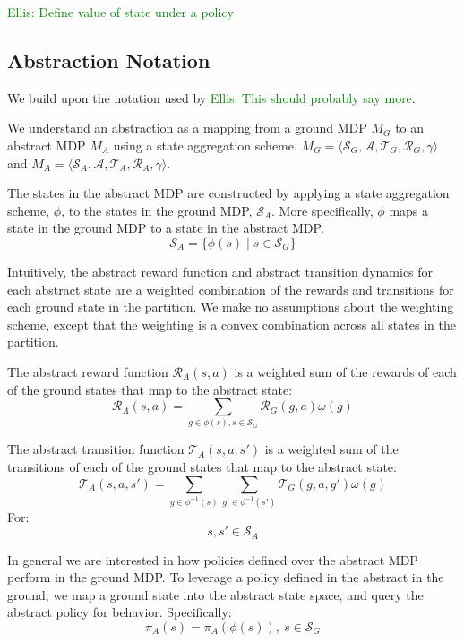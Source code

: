 \documentclass{article}
\newcommand\enote[1]{\textcolor{green}{Ellis: #1}}
\begin{document}
\enote{Define value of state under a policy}

\subsection{Abstraction Notation}
We build upon the notation used by \cite{li2006towards} \enote{This should probably say more}.

We understand an abstraction as a mapping from a ground MDP $M_G$ to an abstract MDP $M_A$ using a state aggregation scheme. $M_G = \langle \mathcal{S}_G, \mathcal{A}, \mathcal{T}_G, \mathcal{R}_G, \gamma \rangle$ and $M_A = \langle \mathcal{S}_A, \mathcal{A}, \mathcal{T}_A, \mathcal{R}_A, \gamma \rangle$.

The states in the abstract MDP are constructed by applying a state aggregation scheme, $\phi$, to the states in the ground MDP, $\mathcal{S}_A$. More specifically, $\phi$ maps a state in the ground MDP to a state in the abstract MDP.
\begin{equation}
\mathcal{S}_A = \{ \phi(s) \mid s \in \mathcal{S}_G\}
\end{equation}

Intuitively, the abstract reward function and abstract transition dynamics for each abstract state are a weighted combination of the rewards and transitions for each ground state in the partition. We make no assumptions about the weighting scheme, except that the weighting is a convex combination across all states in the partition.

The abstract reward function $\mathcal{R}_A(s,a)$ is a weighted sum of the rewards of each of the ground states that map to the abstract state:
\begin{equation}
\mathcal{R}_A(s,a) = \sum_{g \in \phi(s), s \in \mathcal{S}_G} \mathcal{R}_G(g,a) \omega(g) 
\end{equation}


The abstract transition function $\mathcal{T}_A(s,a,s')$ is a weighted sum of the transitions of each of the ground states that map to the abstract state:
\begin{equation}
\mathcal{T}_A(s,a,s') = \sum_{g \in \phi^{-1}(s)} \sum_{g' \in \phi^{-1}(s')} \mathcal{T}_G(g,a,g') \omega(g) 
\end{equation}
For:
\begin{equation}
s, s' \in \mathcal{S}_A
\end{equation}

In general we are interested in how policies defined over the abstract MDP perform in the ground MDP. To leverage a policy defined in the abstract in the ground, we map a ground state into the abstract state space, and query the abstract policy for behavior. Specifically:
\begin{equation}
\pi_A(s) = \pi_A(\phi(s)),\ s \in \mathcal{S}_G
\end{equation}
\end{document}
